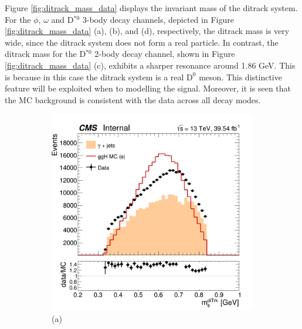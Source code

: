 Figure \ref{fig:ditrack_mass_data} displays the invariant mass of the ditrack system. For the $\phi$, $\omega$ and D$^{*0}$ 3-body decay channels, depicted in Figure \ref{fig:ditrack_mass_data} (a), (b), and (d), respectively, the ditrack mass is very wide, since the ditrack system does not form a real particle. In contrast, the ditrack mass for the D$^{*0}$ 2-body decay channel, shown in Figure \ref{fig:ditrack_mass_data} (c), exhibits a sharper resonance around 1.86 GeV. This is because in this case the ditrack system is a real $\text{D}^{0}$ meson. This distinctive feature will be exploited when to modelling the signal. Moreover, it is seen that the MC background is consistent with the data across all decay modes.
\begin{figure}[!ht]
    \captionsetup[subfigure]{labelformat=empty}
    \vspace*{-0.2cm}
    \centering
    \setlength{\mylength}{\textwidth}
    \begin{subfigure}[t]{0.50\mylength}
        \centering
        \includegraphics[width=0.49\mylength]{resources/plots/Phi3_ditrk_mass.png}
        \vspace*{-0.2cm}
        \caption{\footnotesize (a)}
    \end{subfigure}%
    \begin{subfigure}[t]{0.50\mylength}
        \centering

\end{subfigure}
\end{figure}
